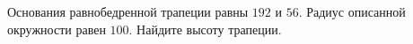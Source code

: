\begin{ex}
	\begin{condition}
		Основания равнобедренной трапеции равны \( 192  \) и \( 56 \). Радиус описанной окружности равен \( 100 \). Найдите высоту трапеции.
	\end{condition}
\end{ex}
